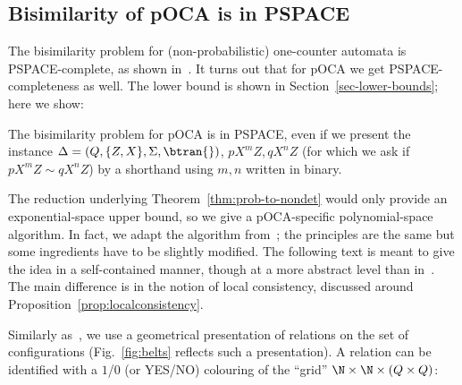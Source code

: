 \subsection{Bisimilarity
of pOCA is in PSPACE}\label{sec:bispOCAinPSPACE}

The bisimilarity problem for (non-probabilistic)
one-counter automata is  PSPACE-complete, as shown
in~\cite{BGJ:Concur10}. It turns out that for pOCA we get
PSPACE-completeness as well.
The lower bound is shown in Section~\ref{sec-lower-bounds}; here
we show:

\begin{theorem} \label{thm-bisim-pOCA-inPspace}
The bisimilarity problem for pOCA is in PSPACE, even
if we present the instance
 $\Delta=(Q,\{Z,X\},\Sigma,\mathord{\btran{}})$,
$p X^mZ, q X^nZ$ (for which we ask if $p X^mZ\sim q X^nZ$)
by a shorthand using $m,n$ written in binary.
\end{theorem}
The reduction underlying
Theorem~\ref{thm:prob-to-nondet} would only provide an
exponential-space upper bound, so
we give a pOCA-specific polynomial-space algorithm.
In fact, we adapt the algorithm from~\cite{BGJ:Concur10};
the principles are the same but some
ingredients have to be slightly modified.
The following text is meant to give the idea in a self-contained
manner, though at a more abstract
level than in~\cite{BGJ:Concur10}.
The main difference is in the notion of local consistency, discussed
around Proposition~\ref{prop:localconsistency}.

Similarly as~\cite{BGJ:Concur10},
we use a geometrical presentation of relations on
the set of configurations (Fig.~\ref{fig:belts} reflects such a
presentation).
A relation can be identified with
a $1$/$0$ (or YES/NO)
colouring of the ``grid''  $\N\times\N\times (Q\times Q)$:


